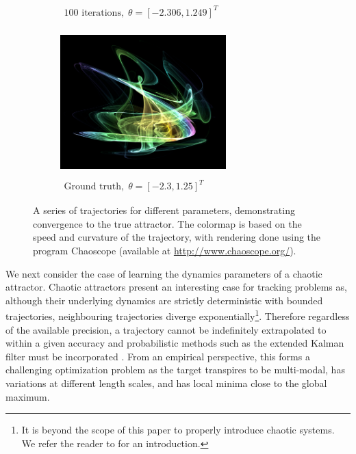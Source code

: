 \begin{figure}[t]
\begin{subfigure}[t]{0.48\textwidth}
		\caption{{$\begin{array}{c}
				\text{100 iterations}, \;
				\theta = [-2.306,1.249]^T 
				\end{array}$}}
	\end{subfigure}
	\begin{subfigure}[t]{0.48\textwidth}
		\centering
		\tiny
		\includegraphics[height=5.6cm,width=6.4cm]{chaos/compressed/target_light.png}
		\caption{{$\begin{array}{c}
				\text{Ground truth}, \;
				\theta = [-2.3,1.25]^T
				\end{array}$}}
	\end{subfigure}
	\caption{A series of trajectories for different parameters, demonstrating convergence to the true attractor.  The colormap is based on the speed and curvature of the trajectory, with rendering done using the program Chaoscope (available at {\href{http://www.chaoscope.org/}{http://www.chaoscope.org/}}). \label{fig:chaoscope}}
\end{figure}

We next consider the case of learning the dynamics parameters of a chaotic attractor.  Chaotic attractors present an interesting case for tracking problems as, although their underlying dynamics are strictly deterministic with bounded trajectories, neighbouring trajectories diverge exponentially\footnote{It is beyond the scope of this paper to properly introduce chaotic systems.  We refer the reader to \cite{devaney1989introduction} for an introduction.}.  Therefore regardless of the available precision, a trajectory cannot be indefinitely extrapolated to within a given accuracy and probabilistic methods such as the extended Kalman filter must be incorporated \citep{fujii2013extended,ruan2003chaotic}. From an empirical perspective, this forms a challenging optimization problem as the target transpires to be multi-modal, has variations at different length scales, and has local minima close to the global maximum.

